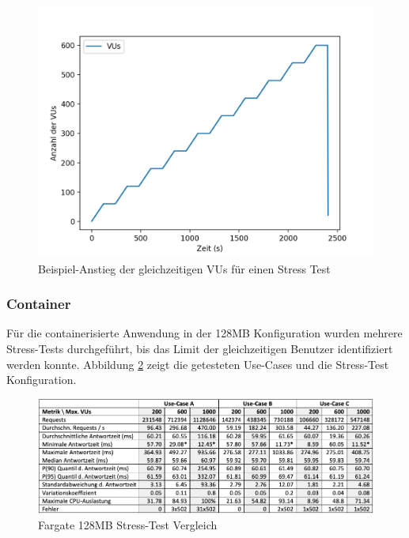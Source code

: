 \begin{figure}[H]
    \includegraphics[width=\textwidth]{img/stress-vus-example.png}
    \caption[Beispiel-Anstieg der gleichzeitigen VUs für einen Stress Test]{Beispiel-Anstieg der gleichzeitigen VUs für einen Stress Test}
    \label{fig:stress-vus-example}
\end{figure}

\subsubsection{Container}
Für die containerisierte Anwendung in der 128MB Konfiguration wurden mehrere Stress-Tests durchgeführt, bis das Limit der gleichzeitigen Benutzer identifiziert werden konnte. Abbildung \ref{fig:fargate128-stress-comparison} zeigt die getesteten Use-Cases und die Stress-Test Konfiguration. 

\begin{figure}[H]
    \includegraphics[width=\textwidth]{img/fargate128-stress-comparison.png}
    \caption[Fargate 128MB Stress-Test Vergleich]{Fargate 128MB Stress-Test Vergleich}
    \label{fig:fargate128-stress-comparison}
\end{figure}

